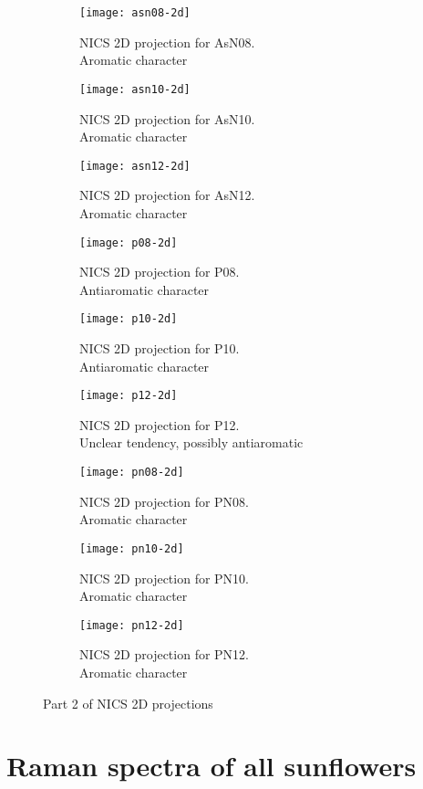 \begin{figure*}[h]
\centering
\begin{subfigure}{5.5cm}\centering\texttt{[image: asn08-2d]}\caption{NICS 2D projection for AsN08.\\Aromatic character}\end{subfigure}%
\begin{subfigure}{5.5cm}\centering\texttt{[image: asn10-2d]}\caption{NICS 2D projection for AsN10.\\Aromatic character}\end{subfigure}%
\begin{subfigure}{5.5cm}\centering\texttt{[image: asn12-2d]}\caption{NICS 2D projection for AsN12.\\Aromatic character}\end{subfigure}
\begin{subfigure}{5.5cm}\centering\texttt{[image: p08-2d]}\caption{NICS 2D projection for P08.\\Antiaromatic character}\end{subfigure}%
\begin{subfigure}{5.5cm}\centering\texttt{[image: p10-2d]}\caption{NICS 2D projection for P10.\\Antiaromatic character}\end{subfigure}%
\begin{subfigure}{5.5cm}\centering\texttt{[image: p12-2d]}\caption{NICS 2D projection for P12.\\Unclear tendency, possibly antiaromatic}\end{subfigure}
\begin{subfigure}{5.5cm}\centering\texttt{[image: pn08-2d]}\caption{NICS 2D projection for PN08.\\Aromatic character}\end{subfigure}%
\begin{subfigure}{5.5cm}\centering\texttt{[image: pn10-2d]}\caption{NICS 2D projection for PN10.\\Aromatic character}\end{subfigure}%
\begin{subfigure}{5.5cm}\centering\texttt{[image: pn12-2d]}\caption{NICS 2D projection for PN12.\\Aromatic character}\end{subfigure}
\caption[Part 2 of NICS 2D projections]{Part 2 of NICS 2D projections}
\end{figure*}


\newpage
\section{Raman spectra of all sunflowers}

